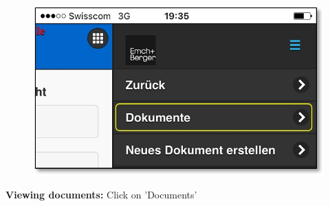 \begin{figure}   %
  \vspace{-35pt}      %
  \begin{center}
    \includegraphics[width=1\linewidth]{../chapters/11_Dokumentenablage/pictures/11-mob02_Dokumente_anschauen.jpg}
  \end{center}
  \vspace{-20pt}
  \vspace{-10pt}
\end{figure}


\textbf{Viewing documents:} Click on 'Documents'

\pagebreak

